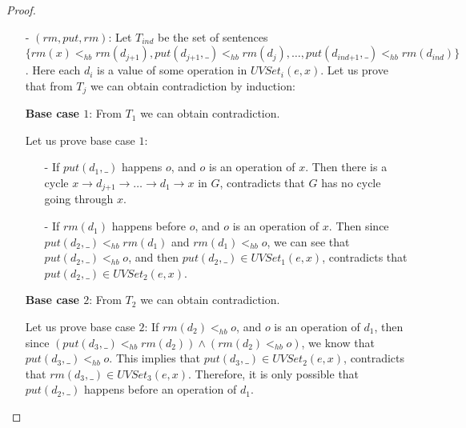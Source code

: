 \begin {proof}
\begin{itemize}
\begin{itemize}
    \item[-] If $( j > 1 ) \wedge ( \textit{rm}(d_j) <_{hb} o'' )$, where $o''$ is an operation of value $d_{\textit{j-1}}$ and $\textit{put}(d_{\textit{j-1}},\_), \textit{rm}(d_{\textit{j-1}}) \in \textit{UVSet}_{\textit{j-1}}(e,x)$: Then since $( \textit{put}(d_{\textit{j+1}},\_) <_{hb} \textit{put}(d_j,\_) ) \wedge ( \textit{rm}(d_j) <_{hb} o'' )$, we can see that $( \textit{put}(d_{\textit{j+1}},\_) <_{hb} o'' ) \vee ( \textit{rm}(d_j) <_{hb} \textit{put}(d_j,\_) )$, which is impossible.

    \item[-] If $( j > 1 ) \wedge ( \textit{rm}(d_j) <_{hb} o'' )$, where $o''$ is an operation of $x$: Similar to above case.
    \end{itemize}

\item[-] $(\textit{rm},\textit{put},\textit{rm})$: Let $T_{\textit{ind}}$ be the set of sentences $\{ \textit{rm}(x) <_{hb} \textit{rm}(d_{\textit{j+1}}), \textit{put}(d_{\textit{j+1}},\_) <_{hb} \textit{rm}(d_j),\ldots, \textit{put}(d_{\textit{ind+1}},\_) <_{hb} \textit{rm}(d_{\textit{ind}}) \}$. Here each $d_i$ is a value of some operation in $\textit{UVSet}_i(e,x)$. Let us prove that from $T_j$ we can obtain contradiction by induction:

    {\bf Base case $1$}: From $T_1$ we can obtain contradiction.

    Let us prove base case $1$:

    \begin{itemize}
    \setlength{\itemsep}{0.5pt}
    \item[-] If $\textit{put}(d_1,\_)$ happens $o$, and $o$ is an operation of $x$. Then there is a cycle $x \rightarrow d_{\textit{j+1}} \rightarrow \ldots \rightarrow d_1 \rightarrow x$ in $G$, contradicts that $G$ has no cycle going through $x$.

    \item[-] If $\textit{rm}(d_1)$ happens before $o$, and $o$ is an operation of $x$. Then since $\textit{put}(d_2,\_) <_{hb} \textit{rm}(d_1)$ and $\textit{rm}(d_1) <_{hb} o$, we can see that $\textit{put}(d_2,\_) <_{hb} o$, and then $\textit{put}(d_2,\_) \in \textit{UVSet}_1(e,x)$, contradicts that $\textit{put}(d_2,\_) \in \textit{UVSet}_2(e,x)$.
    \end{itemize}

    {\bf Base case $2$}: From $T_2$ we can obtain contradiction.

    Let us prove base case $2$: If $\textit{rm}(d_2) <_{hb} o$, and $o$ is an operation of $d_1$, then since $( \textit{put}(d_3,\_) <_{hb} \textit{rm}(d_2) ) \wedge ( \textit{rm}(d_2) <_{hb} o )$, we know that $\textit{put}(d_3,\_) <_{hb} o$. This implies that $\textit{put}(d_3,\_) \in \textit{UVSet}_2(e,x)$, contradicts that $\textit{rm}(d_3,\_) \in \textit{UVSet}_3(e,x)$. Therefore, it is only possible that $\textit{put}(d_2,\_)$ happens before an operation of $d_1$.


\end{itemize}
\end{proof}
